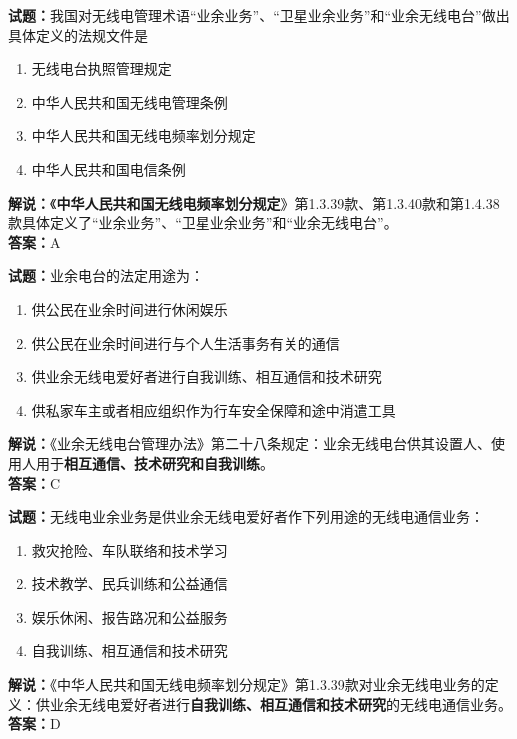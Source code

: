 \documentclass{ctexbook}
\begin{document}
\vspace{1em}

\textbf{试题：}我国对无线电管理术语“业余业务”、“卫星业余业务”和“业余无线电台”做出具体定义的法规文件是
\begin{enumerate}[leftmargin=3em]
  \item 无线电台执照管理规定
  \item 中华人民共和国无线电管理条例
  \item 中华人民共和国无线电频率划分规定
  \item 中华人民共和国电信条例
\end{enumerate}
\textbf{解说：}《\textbf{中华人民共和国无线电频率划分规定}》第1.3.39款、第1.3.40款和第1.4.38款具体定义了“业余业务”、“卫星业余业务”和“业余无线电台”。\\\noindent\textbf{答案：}A

\vspace{1em}

\textbf{试题：}业余电台的法定用途为：
\begin{enumerate}[leftmargin=3em]
  \item 供公民在业余时间进行休闲娱乐
  \item 供公民在业余时间进行与个人生活事务有关的通信
  \item 供业余无线电爱好者进行自我训练、相互通信和技术研究
  \item 供私家车主或者相应组织作为行车安全保障和途中消遣工具
\end{enumerate}
\noindent\textbf{解说：}《业余无线电台管理办法》第二十八条规定：业余无线电台供其设置人、使用人用于\textbf{相互通信、技术研究和自我训练}。\\\noindent\textbf{答案：}C

\vspace{1em}

\textbf{试题：}无线电业余业务是供业余无线电爱好者作下列用途的无线电通信业务：
\begin{enumerate}[leftmargin=3em]
  \item 救灾抢险、车队联络和技术学习
  \item 技术教学、民兵训练和公益通信
  \item 娱乐休闲、报告路况和公益服务
  \item 自我训练、相互通信和技术研究
\end{enumerate}
\noindent\textbf{解说：}《中华人民共和国无线电频率划分规定》第1.3.39款对业余无线电业务的定义：供业余无线电爱好者进行\textbf{自我训练、相互通信和技术研究}的无线电通信业务。\\\noindent\textbf{答案：}D
\end{document}
